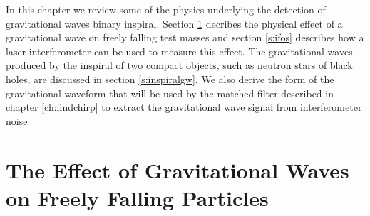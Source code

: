 
In this chapter we review some of the physics underlying the detection of
gravitational waves binary inspiral. Section \ref{s:effect} decribes the
physical effect of a gravitational wave on freely falling test masses and
section \ref{s:ifos} describes how a laser interferometer can be used to
measure this effect. The gravitational waves produced by the inspiral of two
compact objects, such as neutron stars of black holes, are discussed in
section \ref{s:inspiralgw}. We also derive the form of the gravitational
waveform that will be used by the matched filter described in chapter
\ref{ch:findchirp} to extract the gravitational wave signal from
interferometer noise.

\section{The Effect of Gravitational Waves on Freely Falling Particles}
\label{s:effect}

